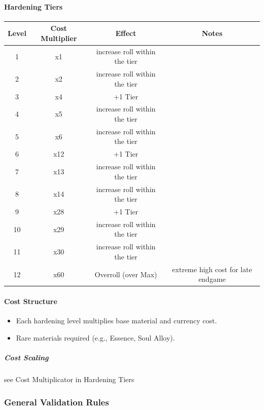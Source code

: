 \paragraph{Hardening Tiers}
\begin{center}
	\begin{tabular}{|c|c|c|c|}
		\hline
		\textbf{Level} & \textbf{Cost Multiplier} & \textbf{Effect} & \textbf{Notes} \\ \hline
		1 & x1 & increase roll within the tier &  \\ 
		2 & x2 & increase roll within the tier &  \\ 
		3 & x4 & +1 Tier  &  \\ 
		4 & x5 & increase roll within the tier &  \\ 
		5 & x6 & increase roll within the tier &  \\ 
		6 & x12 & +1 Tier &  \\
		7 & x13 & increase roll within the tier &  \\
		8 & x14 & increase roll within the tier &  \\
		9 & x28 & +1 Tier &  \\ 
		10& x29 & increase roll within the tier & \\
		11& x30 & increase roll within the tier & \\
		12& x60 & Overroll (over Max) & extreme high cost for late endgame\\ \hline
	\end{tabular}
\end{center}

\paragraph{Cost Structure}

\begin{itemize}
	\item Each hardening level multiplies base material and currency cost.
	\item Rare materials required (e.g., Essence, Soul Alloy).
\end{itemize}

\subparagraph{Cost Scaling}

see Cost Multiplicator in Hardening Tiers

\vspace{1em}
\subsubsection*{General Validation Rules}

